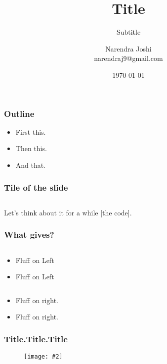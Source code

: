 \documentclass{beamer}
\title{Title}
\subtitle{Subtitle}
\author{Narendra Joshi \\
  \medskip
  narendraj9@gmail.com
}
\date{\today}
\newenvironment{fimage}[2][\textheight]
               { \begin{figure}
                   \centering
                   \texttt{[image: \#2]}
               }
               { \end{figure} }
\begin{document}
\begin{frame}
  \titlepage
\end{frame}

\begin{frame}[t]
  \frametitle{Outline}

  \begin{itemize}
  \item{First this.}
  \item{Then this.}
  \item{And that.}
  \end{itemize}

\end{frame}

\begin{frame}[fragile,t]
  \frametitle{Tile of the slide}

  \inputminted[frame=lines,fontsize=\footnotesize,linenos=true]{c}{pathToFile}

  Let's think about it for a while [the code].

\end{frame}

\begin{frame}[fragile,t]
  \frametitle{What gives?}
  
  \begin{multicols}{2}

    \inputminted[frame=lines,fontsize=\tiny]{haskell}{fileOnLeft.hs}

    \begin{itemize}
    \item Fluff on Left
    \item Fluff on Left
    \end{itemize}

    \columnbreak

    \inputminted[frame=lines,fontsize=\tiny]{haskell}{fileOnRight.hs}

    \begin{itemize}
    \item Fluff on right.
    \item Fluff on right.
    \end{itemize}

  \end{multicols}

\end{frame}

\begin{frame}[t]
  \frametitle{Title.Title.Title}
  \begin{fimage}[18em]{beginnings} \end{fimage}
\end{frame}
\end{document}
